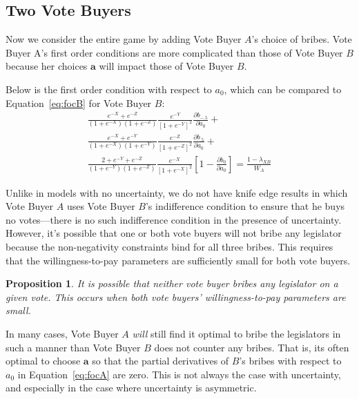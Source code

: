 \documentclass[12pt]{article}
\newtheorem{proposition}{Proposition}
\begin{document}
		
\subsection{Two Vote Buyers}		
Now we consider the entire game by adding Vote Buyer $A$'s choice of bribes. Vote Buyer A's first order conditions are more complicated than those of Vote Buyer $B$ because her choices $\bm a$ will impact those of Vote Buyer $B$.

Below is the first order condition with respect to $a_0$, which can be compared to Equation~\ref{eq:focB} for Vote Buyer $B$:
			 \begin{multline}
					 \frac{e^{-X} + e^{-Z}}{\left(1+e^{-X}\right)\left(1+e^{-Z}\right)} \frac{e^{-Y}}{\left[1+e^{-Y}\right]^2} \frac{\partial b_{-.5}}{\partial a_0} + \\ 
					\frac{e^{-X} + e^{-Y}}{\left(1+e^{-X}\right)\left(1+e^{-Y}\right)} \frac{e^{-Z}}{\left[1+e^{-Z}\right]^2}\frac{\partial b_{.5}}{\partial a_0} + \\
					\frac{2+e^{-Y} + e^{-Z}}{\left(1+e^{-Y}\right)\left(1+e^{-Z}\right)} \frac{e^{-X}}{\left[1+e^{-X}\right]^2}\left[1 - \frac{\partial b_0}{\partial a_0} \right] = \frac{1 - \lambda_{XB}}{W_A}
					\label{eq:focA}
				\end{multline}

Unlike in models with no uncertainty, we do not have knife edge results in which Vote Buyer $A$ uses Vote Buyer $B$'s indifference condition to ensure that he buys no votes---there is no such indifference condition in the presence of uncertainty. However, it's possible that one or both vote buyers will not bribe any legislator because the non-negativity constraints bind for all three bribes. This requires that the willingness-to-pay parameters are sufficiently small for both vote buyers.
		
\begin{proposition}
  It is possible that neither vote buyer bribes any legislator on a given vote. This occurs when both vote buyers' willingness-to-pay parameters are small.
\end{proposition}

In many cases, Vote Buyer $A$ \textit{will} still find it optimal to bribe the legislators in such a manner than Vote Buyer $B$ does not counter any bribes. That is, its often optimal to choose $\bm a$ so that the partial derivatives of $B$'s bribes with respect to $a_0$ in Equation~\ref{eq:focA} are zero. This is not always the case with uncertainty, and especially in the case where uncertainty is asymmetric.
\end{document}
